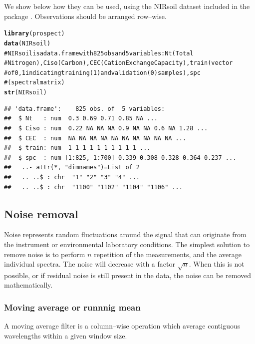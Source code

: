 \documentclass[12pt]{article}\usepackage{graphicx, color}
\makeatletter
\newcommand{\hlfunctioncall}[1]{\textcolor[rgb]{0.501960784313725,0,0.329411764705882}{\textbf{#1}}}%
\newcommand{\hlcomment}[1]{\textcolor[rgb]{0.180392156862745,0.6,0.341176470588235}{#1}}%
\newenvironment{kframe}{%
 \def\at@end@of@kframe{}%
 \ifinner\ifhmode%
  \def\at@end@of@kframe{\end{minipage}}%
  \begin{minipage}{\columnwidth}%
 \fi\fi%
 \def\FrameCommand##1{\hskip\@totalleftmargin \hskip-\fboxsep
 \colorbox{shadecolor}{##1}\hskip-\fboxsep
     \hskip-\linewidth \hskip-\@totalleftmargin \hskip\columnwidth}%
 \MakeFramed {\advance\hsize-\width
   \@totalleftmargin\z@ \linewidth\hsize
   \@setminipage}}%
 {\par\unskip\endMakeFramed%
 \at@end@of@kframe}
\newenvironment{knitrout}{}{} %
\makeatother
\begin{document}
We show below how they can be used, using the NIRsoil dataset included in the package \cite{fernandez2008}. Observations should be arranged row--wise.

\begin{knitrout}
\color{fgcolor}\begin{kframe}
\begin{alltt}
\hlfunctioncall{library}(prospect)
\hlfunctioncall{data}(NIRsoil)
\hlcomment{# NIRsoil is a data.frame with 825 obs and 5 variables: Nt (Total}
\hlcomment{# Nitrogen), Ciso (Carbon), CEC (Cation Exchange Capacity), train (vector}
\hlcomment{# of 0,1 indicating training (1) and validation (0) samples), spc}
\hlcomment{# (spectral matrix)}
\hlfunctioncall{str}(NIRsoil)
\end{alltt}
\begin{verbatim}
## 'data.frame':	825 obs. of  5 variables:
##  $ Nt   : num  0.3 0.69 0.71 0.85 NA ...
##  $ Ciso : num  0.22 NA NA NA 0.9 NA NA 0.6 NA 1.28 ...
##  $ CEC  : num  NA NA NA NA NA NA NA NA NA NA ...
##  $ train: num  1 1 1 1 1 1 1 1 1 1 ...
##  $ spc  : num [1:825, 1:700] 0.339 0.308 0.328 0.364 0.237 ...
##   ..- attr(*, "dimnames")=List of 2
##   .. ..$ : chr  "1" "2" "3" "4" ...
##   .. ..$ : chr  "1100" "1102" "1104" "1106" ...
\end{verbatim}
\end{kframe}
\end{knitrout}


\subsection{Noise removal}

Noise represents random fluctuations around the signal that can originate from the instrument or environmental laboratory conditions. The simplest solution to remove noise is to perform $n$ repetition of the measurements, and the average individual spectra. The noise will decrease with a factor $\sqrt{n}$. When this is not possible, or if residual noise is still present in the data, the noise can be removed mathematically. 
  
\subsubsection{Moving average or runnnig mean}

A moving average filter is a column--wise operation which average contiguous wavelengths within a given window size. 
\end{document}
